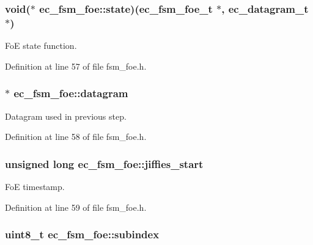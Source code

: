 \subsubsection[{state}]{\setlength{\rightskip}{0pt plus 5cm}void($\ast$ {\bf ec\-\_\-fsm\-\_\-foe\-::state})({\bf ec\-\_\-fsm\-\_\-foe\-\_\-t} $\ast$, {\bf ec\-\_\-datagram\-\_\-t} $\ast$)}\label{structec__fsm__foe_a54f3559cf8f73871bf1035c6e89c4f59}


\-Fo\-E state function. 



\-Definition at line 57 of file fsm\-\_\-foe.\-h.

\subsubsection[{datagram}]{$\ast$ {\bf ec\-\_\-fsm\-\_\-foe\-::datagram}}\label{structec__fsm__foe_a19c8a77b4f92a3813f23262c3c89dbfc}


\-Datagram used in previous step. 



\-Definition at line 58 of file fsm\-\_\-foe.\-h.

\subsubsection[{jiffies\-\_\-start}]{\setlength{\rightskip}{0pt plus 5cm}unsigned long {\bf ec\-\_\-fsm\-\_\-foe\-::jiffies\-\_\-start}}\label{structec__fsm__foe_a42f6c78ac58392cab6a186e5dd43a992}


\-Fo\-E timestamp. 



\-Definition at line 59 of file fsm\-\_\-foe.\-h.

\subsubsection[{subindex}]{\setlength{\rightskip}{0pt plus 5cm}uint8\-\_\-t {\bf ec\-\_\-fsm\-\_\-foe\-::subindex}}\label{structec__fsm__foe_a14293bb60b8829e96d5463d412dff4e0}


